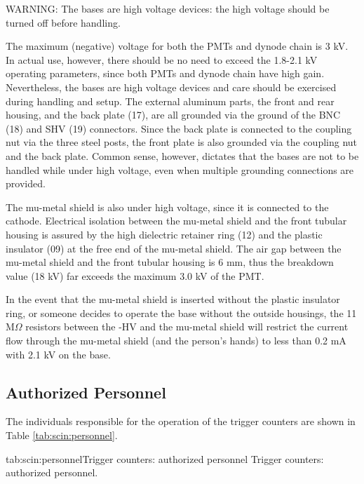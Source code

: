 \begin{safetyen}{10}{10}
  WARNING: The bases are high voltage devices: the high voltage should be
  turned off before handling.
  
  The maximum (negative) voltage for both the PMTs and dynode chain is 3 kV. In actual 
  use, however, there should be no need to exceed the 1.8-2.1 kV operating 
  parameters, since both PMTs and dynode chain have high gain. Nevertheless, the 
  bases are high voltage devices and care should be exercised during handling and 
  setup. The external aluminum parts, the front and rear housing, and the back 
  plate (17), are all grounded via the ground of the BNC (18) and SHV (19) 
  connectors. Since the back plate is connected to the coupling nut via the three 
  steel posts, the front plate is also grounded via the coupling nut and the back 
  plate. Common sense, however, dictates that the bases are not to be handled     
  while under high voltage, even when multiple grounding connections are provided.
  
  The mu-metal shield is also under high voltage, since it is connected to the 
  cathode. Electrical isolation between the mu-metal shield and the front 
  tubular housing is assured by the high dielectric retainer ring (12) and the 
  plastic insulator (09) at the free end of the mu-metal shield. The air gap 
  between the mu-metal shield and the front tubular housing is 6 mm, thus the 
  breakdown value (18 kV) far exceeds the maximum 3.0 kV of the PMT.
  
  In the event that the mu-metal shield is inserted without the plastic insulator 
  ring, or someone decides to operate the base without the outside housings, the 
  11 M$\Omega$ resistors between the -HV and the mu-metal shield will restrict the 
  current flow through the mu-metal shield (and the person's hands) to less than 0.2 
  mA with 2.1 kV on the base. 
\end{safetyen}

\begin{safetyen}{10}{15}
\section{Authorized Personnel}
\end{safetyen}

The individuals responsible for the operation 
of the trigger counters are shown in Table \ref{tab:scin:personnel}.

\begin{namestab}{tab:scin:personnel}{Trigger counters: authorized personnel}{%
      Trigger counters: authorized personnel.}
  \JackSegal{}
\end{namestab}

